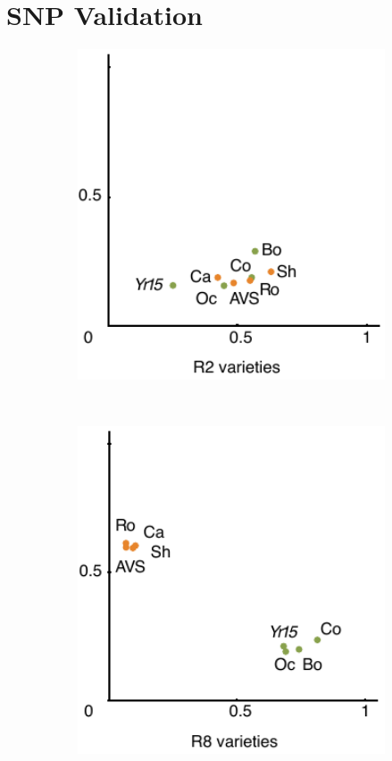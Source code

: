 \section {SNP Validation}
\begin{figure}
\begin{subfigure}{0.31\textwidth}
\caption{}
\label{fig:yr15:r2}
\includegraphics[width=1\textwidth]{Yr15/Figures/selection/R2.pdf}
\end{subfigure}
~
\begin{subfigure}{0.31\textwidth}
\caption{}
\label{fig:yr15:r8}
\includegraphics[width=1\textwidth]{Yr15/Figures/selection/R8.pdf}

\end{subfigure}
\end{figure}
